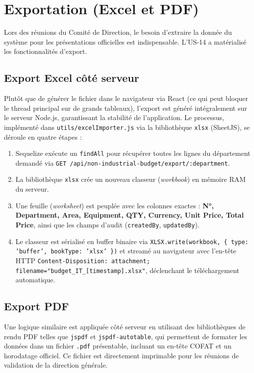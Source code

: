 \section{Exportation (Excel et PDF)}
Lors des réunions du Comité de Direction, le besoin d'extraire la donnée du système pour les présentations officielles est indispensable. L'US-14 a matérialisé les fonctionnalités d'export.

\subsection{Export Excel côté serveur}
Plutôt que de générer le fichier dans le navigateur via React (ce qui peut bloquer le thread principal sur de grands tableaux), l'export est généré intégralement sur le serveur Node.js, garantissant la stabilité de l'application. Le processus, implémenté dans \texttt{utils/excelImporter.js} via la bibliothèque \texttt{xlsx} (SheetJS), se déroule en quatre étapes :

\begin{enumerate}
    \item Sequelize exécute un \texttt{findAll} pour récupérer toutes les lignes du département demandé via \texttt{GET /api/non-industrial-budget/export/:department}.
    \item La bibliothèque \texttt{xlsx} crée un nouveau classeur (\textit{workbook}) en mémoire RAM du serveur.
    \item Une feuille (\textit{worksheet}) est peuplée avec les colonnes exactes : \textbf{N°, Department, Area, Equipment, QTY, Currency, Unit Price, Total Price}, ainsi que les champs d'audit (\texttt{createdBy}, \texttt{updatedBy}).
    \item Le classeur est sérialisé en buffer binaire via \texttt{XLSX.write(workbook, \{ type: 'buffer', bookType: 'xlsx' \})} et streamé au navigateur avec l'en-tête HTTP \texttt{Content-Disposition: attachment; filename="budget\_IT\_[timestamp].xlsx"}, déclenchant le téléchargement automatique.
\end{enumerate}

\subsection{Export PDF}
Une logique similaire est appliquée côté serveur en utilisant des bibliothèques de rendu PDF telles que \texttt{jspdf} et \texttt{jspdf-autotable}, qui permettent de formater les données dans un fichier \texttt{.pdf} présentable, incluant un en-tête COFAT et un horodatage officiel. Ce fichier est directement imprimable pour les réunions de validation de la direction générale.


